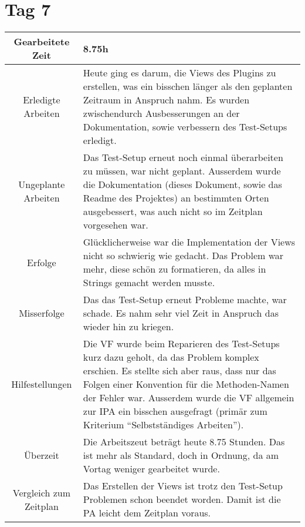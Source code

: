 \section{Tag 7}
\begin{tabularx}{\textwidth}[H]{|c|X|}
  \hline
  Gearbeitete Zeit & 8.75h \\ \hline
  Erledigte Arbeiten & Heute ging es darum, die Views des Plugins zu erstellen, was ein bisschen länger als den geplanten
  Zeitraum in Anspruch nahm. Es wurden zwischendurch Ausbesserungen an der Dokumentation, sowie verbessern des Test-Setups
  erledigt. \\ \hline
  Ungeplante Arbeiten & Das Test-Setup erneut noch einmal überarbeiten zu müssen, war nicht geplant. Ausserdem wurde die
  Dokumentation (dieses Dokument, sowie das Readme des Projektes) an bestimmten Orten ausgebessert, was auch nicht so im
  Zeitplan vorgesehen war. \\ \hline
  Erfolge & Glücklicherweise war die Implementation der Views nicht so schwierig wie gedacht. Das Problem war mehr, diese
  schön zu formatieren, da alles in Strings gemacht werden musste. \\ \hline
  Misserfolge & Das das Test-Setup erneut Probleme machte, war schade. Es nahm sehr viel Zeit in Anspruch das wieder hin zu
  kriegen. \\ \hline
  Hilfestellungen & Die VF wurde beim Reparieren des Test-Setups kurz dazu geholt, da das Problem komplex erschien.
  Es stellte sich aber raus, dass nur das Folgen einer Konvention für die Methoden-Namen der Fehler war. \newline
  Ausserdem wurde die VF allgemein zur IPA ein bisschen ausgefragt (primär zum Kriterium
  \enquote{Selbstständiges Arbeiten}). \\ \hline
  Überzeit & Die Arbeitszeut beträgt heute 8.75 Stunden. Das ist mehr als Standard, doch in Ordnung, da am Vortag weniger
  gearbeitet wurde. \\ \hline
  Vergleich zum Zeitplan & Das Erstellen der Views ist trotz den Test-Setup Problemen schon beendet worden. Damit ist
  die PA leicht dem Zeitplan voraus. \\ \hline
\end{tabularx}

\newpage

